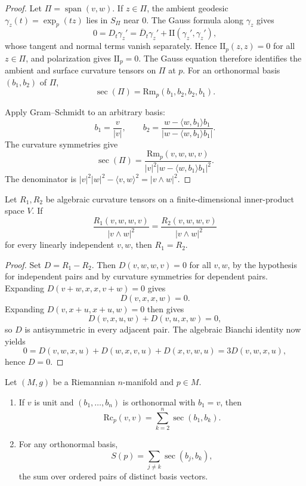 \begin{proof}
\sketch
Let $\Pi=\operatorname{span}(v,w)$.  If $z\in\Pi$, the ambient geodesic
$\gamma_z(t)=\exp_p(tz)$ lies in $S_\Pi$ near $0$.  The Gauss formula along
$\gamma_z$ gives
\[
0=D_t\gamma_z'=\overline D_t\gamma_z'+\mathrm{II}(\gamma_z',\gamma_z'),
\]
whose tangent and normal terms vanish separately.  Hence
$\mathrm{II}_p(z,z)=0$ for all $z\in\Pi$, and polarization gives
$\mathrm{II}_p=0$.  The Gauss equation therefore identifies the ambient and
surface curvature tensors on $\Pi$ at $p$.  For an orthonormal basis
$(b_1,b_2)$ of $\Pi$,
\[
\sec(\Pi)=\mathrm{Rm}_p(b_1,b_2,b_2,b_1).
\]

Apply Gram--Schmidt to an arbitrary basis:
\[
b_1=\frac v{|v|},
\qquad
b_2=\frac{w-\langle w,b_1\rangle b_1}
{|w-\langle w,b_1\rangle b_1|}.
\]
The curvature symmetries give
\begin{equation}
\sec(\Pi)=
\frac{\mathrm{Rm}_p(v,w,w,v)}
{|v|^2|w-\langle w,b_1\rangle b_1|^2}. \tag{8.29}
\end{equation}
The denominator is
$|v|^2|w|^2-\langle v,w\rangle^2=|v\wedge w|^2$.
\end{proof}

\begin{proposition}
\label{prop:sectional-curvature-determines-curvature-tensor}
Let $R_1,R_2$ be algebraic curvature tensors on a finite-dimensional
inner-product space $V$.  If
\[
\frac{R_1(v,w,w,v)}{|v\wedge w|^2}
=\frac{R_2(v,w,w,v)}{|v\wedge w|^2}
\]
for every linearly independent $v,w$, then $R_1=R_2$.
\end{proposition}

\begin{proof}
\sketch
Set $D=R_1-R_2$.  Then $D(v,w,w,v)=0$ for all $v,w$, by the hypothesis for
independent pairs and by curvature symmetries for dependent pairs.  Expanding
$D(v+w,x,x,v+w)=0$ gives
\[
D(v,x,x,w)=0.
\]
Expanding $D(v,x+u,x+u,w)=0$ then gives
\[
D(v,x,u,w)+D(v,u,x,w)=0,
\]
so $D$ is antisymmetric in every adjacent pair.  The algebraic Bianchi
identity now yields
\[
0=D(v,w,x,u)+D(w,x,v,u)+D(x,v,w,u)=3D(v,w,x,u),
\]
hence $D=0$.
\end{proof}

\begin{proposition}
\label{prop:geometric-interpretation-ricci-scalar-curvatures}

Let $(M,g)$ be a Riemannian $n$-manifold and $p\in M$.
\begin{enumerate}
\item[(a)] If $v$ is unit and $(b_1,\ldots,b_n)$ is orthonormal with $b_1=v$,
then
\[
\mathrm{Rc}_p(v,v)=\sum_{k=2}^n\sec(b_1,b_k).
\]
\item[(b)] For any orthonormal basis,
\[
S(p)=\sum_{j\ne k}\sec(b_j,b_k),
\]
the sum over ordered pairs of distinct basis vectors.
\end{enumerate}
\end{proposition}

